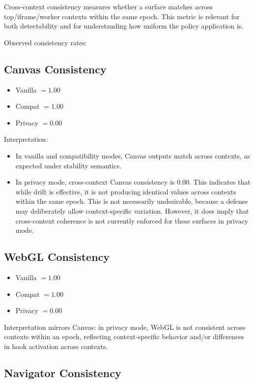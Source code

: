 \documentclass[11pt]{report}
\begin{document}
Cross-context consistency measures whether a surface matches across top/iframe/worker contexts within the same epoch. This metric is relevant for both detectability and for understanding how uniform the policy application is.

Observed consistency rates:

\subsection{Canvas Consistency}

\begin{itemize}
    \item Vanilla $=1.00$
    \item Compat $=1.00$
    \item Privacy $=0.00$
\end{itemize}

Interpretation:
\begin{itemize}
    \item In vanilla and compatibility modes, Canvas outputs match across contexts, as expected under stability semantics.
    \item In privacy mode, cross-context Canvas consistency is $0.00$. This indicates that while drift is effective, it is not producing identical values across contexts within the same epoch. This is not necessarily undesirable, because a defense may deliberately allow context-specific variation. However, it does imply that cross-context coherence is not currently enforced for these surfaces in privacy mode.
\end{itemize}

\subsection{WebGL Consistency}

\begin{itemize}
    \item Vanilla $=1.00$
    \item Compat $=1.00$
    \item Privacy $=0.00$
\end{itemize}

Interpretation mirrors Canvas: in privacy mode, WebGL is not consistent across contexts within an epoch, reflecting context-specific behavior and/or differences in hook activation across contexts.

\subsection{Navigator Consistency}
\end{document}
